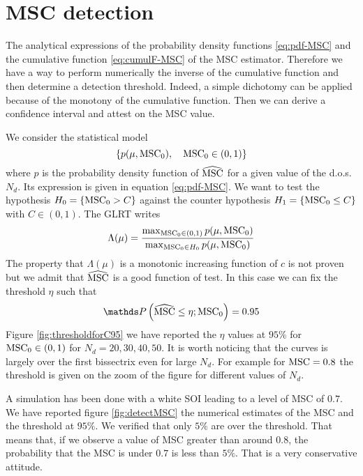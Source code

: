 
\newpage
\section{MSC detection}

The analytical expressions of the probability density functions \eqref{eq:pdf-MSC} and the cumulative function \eqref{eq:cumulF-MSC} of the MSC estimator. Therefore we have a way to perform numerically the inverse of the cumulative function and then determine a detection threshold. Indeed, a simple dichotomy can be applied because of the monotony of the cumulative function. Then we can derive a confidence interval and attest on the MSC value.


We consider the statistical model
$$
 \{ p(\mu,\mathrm{MSC}_{0}), \quad \mathrm{MSC}_{0}\in(0,1) \}
$$
where $p$ is the probability density function of $\widehat{\mathrm{MSC}}$ for a given value of the d.o.s.
$N_{d}$. Its expression is given in equation \eqref{eq:pdf-MSC}. We want to test the hypothesis $H_{0}=\{\mathrm{MSC}_{0}> C\}$ against the counter hypothesis $H_{1}=\{\mathrm{MSC}_{0} \leq C\}$ with $C\in(0,1)$. The GLRT writes
$$
 \Lambda(\mu) = \frac{\max_{\mathrm{MSC}_{0}\in(0,1)}p(\mu,\mathrm{MSC}_{0})}
                     {\max_{\mathrm{MSC}_{0}\in H_{0}}p(\mu,\mathrm{MSC}_{0})}
$$
The property that $\Lambda(\mu)$ is a monotonic increasing function of $c$ is not proven but we admit that $\widehat{\mathrm{MSC}}$ is a good function of test. In this case we can fix the threshold $\eta$ such that
$$
 \prob{\hMSC\leq \eta; \MSC_{0}} = 0.95
$$
Figure \ref{fig:thresholdforC95} we have reported the $\eta$ values at $95\%$ for $\mathrm{MSC}_{0}\in(0,1)$ for $N_{d}=20, 30, 40, 50$. It is worth noticing that the curves is largely over the first bissectrix even for large $N_{d}$. For example for $\mathrm{MSC}=0.8$ the threshold is given on the zoom of the figure for different values of $N_{d}$.



 \newpage
 A simulation has been done with a white SOI leading to a level of MSC of $0.7$. We have reported figure \ref{fig:detectMSC} the numerical estimates of the MSC and the threshold at $95\%$. We verified that only $5\%$ are over the threshold. That means that, if we observe a value of MSC greater than around $0.8$, the probability that the MSC is under $0.7$ is less than $5\%$. That is a very conservative attitude.
 
